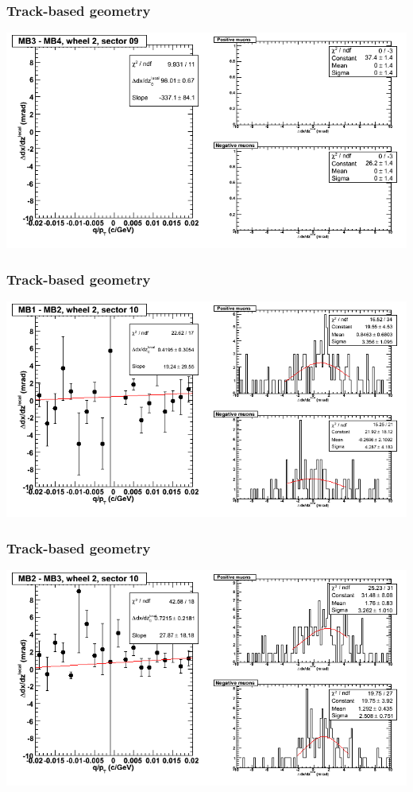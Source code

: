 \documentclass[compress]{beamer}
\begin{document}
\begin{frame}
\frametitle{Track-based geometry}
\includegraphics[width=\linewidth]{NOV4_segdiffs/dt13_slope_E_09_34.png}
\end{frame}

\begin{frame}
\frametitle{Track-based geometry}
\includegraphics[width=\linewidth]{NOV4_segdiffs/dt13_slope_E_10_12.png}
\end{frame}

\begin{frame}
\frametitle{Track-based geometry}
\includegraphics[width=\linewidth]{NOV4_segdiffs/dt13_slope_E_10_23.png}
\end{frame}
\end{document}

